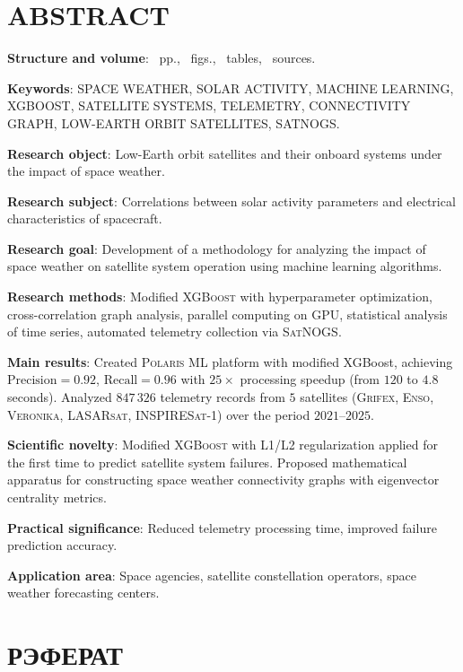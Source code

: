\chapter*{ABSTRACT}

\textbf{Structure and volume}: \maincontentpages~pp., \totalfigures~figs.,
\totaltables~tables, \thetotalsources~sources.

\textbf{Keywords}: SPACE WEATHER, SOLAR ACTIVITY, MACHINE LEARNING, XGBOOST,
SATELLITE SYSTEMS, TELEMETRY, CONNECTIVITY GRAPH, LOW-EARTH ORBIT SATELLITES,
SATNOGS.

\textbf{Research object}: Low-Earth orbit satellites and their onboard systems under the impact of space weather.

\textbf{Research subject}: Correlations between solar activity parameters and electrical characteristics of spacecraft.

\textbf{Research goal}: Development of a methodology for analyzing the impact of space weather on satellite system operation using machine learning algorithms.

\textbf{Research methods}: Modified \textsc{XGBoost} with hyperparameter optimization, cross-correlation graph analysis, parallel computing on \textsc{GPU}, statistical analysis of time series, automated telemetry collection via \textsc{SatNOGS}.

\textbf{Main results}: Created \textsc{Polaris ML} platform with modified XGBoost, achieving 
$\text{Precision} = 0.92$, $\text{Recall} = 0.96$ with $25{\times}$ processing speedup (from $120$ to $4.8$ seconds). Analyzed $847{\,}326$ telemetry records from $5$ satellites (\textsc{Grifex}, \textsc{Enso}, \textsc{Veronika}, \textsc{LASARsat}, \textsc{INSPIRESat-1}) over the period $2021$--$2025$.

\textbf{Scientific novelty}: Modified \textsc{XGBoost} with L1/L2 regularization applied for the first time to predict satellite system failures. Proposed mathematical apparatus for constructing space weather connectivity graphs with eigenvector centrality metrics.

\textbf{Practical significance}: Reduced telemetry processing time, improved failure prediction accuracy.

\textbf{Application area}: Space agencies, satellite constellation operators, space weather forecasting centers.





\chapter*{РЭФЕРАТ}

